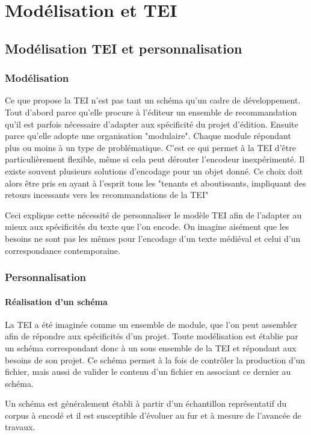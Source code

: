 \documentclass[12pt,a4paper,oneside]{book} %
\begin{document}
\chapter{Modélisation et TEI}
\section{Modélisation TEI et personnalisation}
\subsection{Modélisation}
Ce que propose la TEI n'est pas tant un schéma qu'un cadre de développement. Tout d'abord parce qu'elle procure à l'éditeur un ensemble de recommandation qu'il est parfois nécessaire d'adapter aux spécificité du projet d'édition. Ensuite parce qu'elle adopte une organisation "modulaire". Chaque module répondant plus ou moins à un type de problématique. C'est ce qui permet à la TEI d'être particulièrement flexible, même si cela peut dérouter l'encodeur inexpérimenté. Il existe souvent plusieurs solutions d'encodage pour un objet donné. Ce choix doit alors être pris en ayant à l'esprit tous les "tenants et aboutissants, impliquant des retours incessants vers les recommandations de la TEI"

Ceci explique cette nécessité de personnaliser le modèle TEI afin de l'adapter au mieux aux spécificités du texte que l'on encode. On imagine aisément que les besoins ne sont pas les mêmes pour l'encodage d'un texte médiéval et celui d'un correspondance contemporaine.
\bigskip 

\subsection{Personnalisation}
\subsubsection{Réalisation d'un schéma}
La TEI a été imaginée comme un ensemble de module, que l'on peut assembler afin de répondre aux spécificités d'un projet. Toute modélisation est établie par un schéma correspondant donc à un sous ensemble de la TEI et répondant aux besoins de son projet. Ce schéma permet à la fois de contrôler la production d'un fichier, mais aussi de valider le contenu d'un fichier en associant ce dernier au schéma.
\bigskip 

Un schéma est généralement établi à partir d'un échantillon représentatif du corpus à encodé et il est susceptible d'évoluer au fur et à mesure de l'avancée de travaux.
\bigskip 
\end{document}

